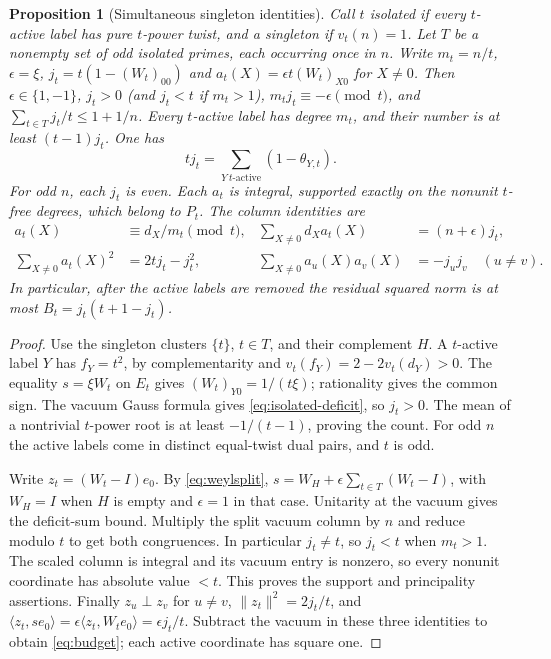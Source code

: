 \documentclass[11pt,a4paper]{article}
\numberwithin{equation}{section}
\newtheorem{proposition}[theorem]{Proposition}
\theoremstyle{remark}
\begin{document}
\begin{proposition}[Simultaneous singleton identities]\label{second:two-columns}
Call $t$ \emph{isolated} if every $t$-active label has pure $t$-power
twist, and a \emph{singleton} if $v_t(n)=1$. Let $T$ be a nonempty
set of odd isolated primes, each occurring
once in $n$. Write $m_t=n/t$, $\epsilon=\xi$,
$j_t=t(1-(W_t)_{00})$ and $a_t(X)=\epsilon t(W_t)_{X0}$ for $X\ne0$.
Then $\epsilon\in\{1,-1\}$, $j_t>0$ (and $j_t<t$ if $m_t>1$),
$m_tj_t\equiv-\epsilon\pmod t$, and
$\sum_{t\in T}j_t/t\le1+1/n$.
Every $t$-active label has degree $m_t$, and their number is at least
$(t-1)j_t$. One has
\begin{equation}\label{eq:isolated-deficit}
 tj_t=\sum_{Y\ t\text{-active}}(1-\theta_{Y,t}).
\end{equation}
For odd $n$, each $j_t$ is even. Each $a_t$ is integral, supported
exactly on the nonunit $t$-free degrees, which belong to $P_t$. The
column identities are
\begin{align}
 a_t(X)&\equiv d_X/m_t\pmod t,&
 \sum_{X\ne0} d_Xa_t(X)&=(n+\epsilon)j_t,\nonumber\\
 \sum_{X\ne0}a_t(X)^2&=2tj_t-j_t^2,&
 \sum_{X\ne0}a_u(X)a_v(X)&=-j_uj_v\quad(u\ne v).\label{eq:budget}
\end{align}
In particular, after the active labels are removed the residual
squared norm is at most $B_t=j_t(t+1-j_t)$.
\end{proposition}
\begin{proof}
Use the singleton clusters $\{t\}$, $t\in T$, and their complement $H$. A $t$-active label $Y$ has
$f_Y=t^2$, by complementarity and $v_t(f_Y)=2-2v_t(d_Y)>0$.
The equality $s=\xi W_t$ on $E_t$ gives $(W_t)_{Y0}=1/(t\xi)$;
rationality gives the common sign. The vacuum Gauss formula gives
\eqref{eq:isolated-deficit}, so $j_t>0$. The mean of a nontrivial
$t$-power root is at least $-1/(t-1)$, proving the count. For odd
$n$ the active labels come in distinct equal-twist dual pairs, and
$t$ is odd.

Write $z_t=(W_t-I)e_0$. By \eqref{eq:weylsplit},
$s=W_H+\epsilon\sum_{t\in T}(W_t-I)$, with $W_H=I$ when $H$ is
empty and $\epsilon=1$ in that case. Unitarity at the vacuum gives
the deficit-sum bound. Multiply the split vacuum column by $n$ and
reduce modulo $t$ to get both congruences. In particular $j_t\ne t$,
so $j_t<t$ when $m_t>1$. The scaled column is integral and its vacuum
entry is nonzero, so every nonunit coordinate has absolute value $<t$. This proves the
support and principality assertions. Finally $z_u\perp z_v$ for
$u\ne v$, $\|z_t\|^2=2j_t/t$, and
$\langle z_t,se_0\rangle=\epsilon\langle z_t,W_te_0\rangle
=\epsilon j_t/t$. Subtract the vacuum in these three identities to
obtain \eqref{eq:budget}; each active coordinate has square one.
\end{proof}
\end{document}
